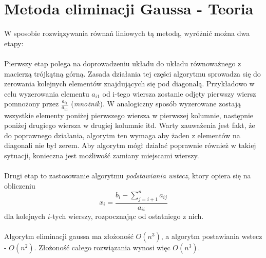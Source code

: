 \documentclass{article}
\begin{document}
\section*{Metoda eliminacji Gaussa - Teoria}
W sposobie rozwiązywania równań liniowych tą metodą, wyróżnić można dwa etapy: \\\\ \indent Pierwszy etap polega na doprowadzeniu układu do układu równoważnego z macierzą trójkątną górną. Zasada działania tej części algorytmu sprowadza się do zerowania kolejnych elementów znajdujących się pod diagonalą. Przykładowo w celu wyzerowania elementu $a_{i1}$ od i-tego wiersza zostanie odjęty pierwszy wiersz pomnożony przez $\frac{a_{i1}}{a_{11}}$ (\textit{mnożnik}). W analogiczny sposób wyzerowane zostają wszystkie elementy poniżej pierwszego wiersza w pierwszej kolumnie, następnie poniżej drugiego wiersza w drugiej kolumnie itd. Warty zauważenia jest fakt, że do poprawnego działania, algorytm ten wymaga aby żaden z elementów na diagonali nie był zerem. Aby algorytm mógł działać poprawnie również w takiej sytuacji, konieczna jest możliwość zamiany miejscami wierszy.\\\\
\indent Drugi etap to zastosowanie algorytmu \textit{podstawiania wstecz}, ktory opiera się na obliczeniu 
$$x_i = \frac{b_i - \sum^{n}_{j=i+1}a_{ij}}{a_{ii}}$$
dla kolejnych $i$-tych wierszy, rozpocznając od ostatniego z nich.\\\\
\indent Algorytm eliminacji gaussa ma złożoność $O(n^3)$, a algorytm postawiania wstecz - $O(n^2)$. Złożoność całego rozwiązania wynosi więc $O(n^3)$.
\end{document}
